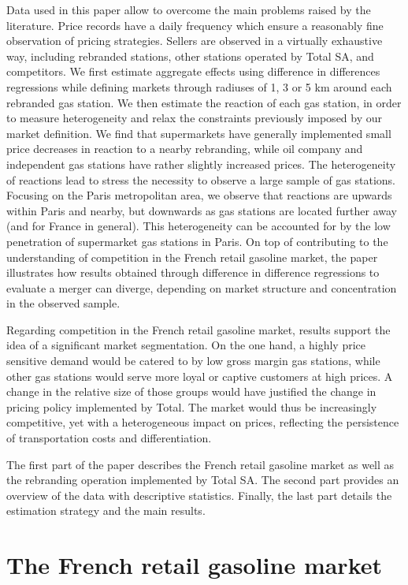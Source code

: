 \documentclass[english]{article}
\begin{document}
Data used in this paper allow to overcome the main problems raised by the literature. Price records have a daily frequency which ensure a reasonably fine observation of pricing strategies. Sellers are observed in a virtually exhaustive way, including rebranded stations, other stations operated by Total SA, and competitors. We first estimate aggregate effects using difference in differences regressions while defining markets through radiuses of 1, 3 or 5 km around each rebranded gas station. We then estimate the reaction of each gas station, in order to measure heterogeneity and relax the constraints previously imposed by our market definition. We find that supermarkets have generally implemented small price decreases in reaction to a nearby rebranding, while oil company and independent gas stations have rather slightly increased prices. The heterogeneity of reactions lead to stress the necessity to observe a large sample of gas stations. Focusing on the Paris metropolitan area, we observe that reactions are upwards within Paris and nearby, but downwards as gas stations are located further away (and for France in general). This heterogeneity can be accounted for by the low penetration of supermarket gas stations in Paris. On top of contributing to the understanding of competition in the French retail gasoline market, the paper illustrates how results obtained through difference in difference regressions to evaluate a merger can diverge, depending on market structure and concentration in the observed sample.
\medskip{}

Regarding competition in the French retail gasoline market, results support the idea of a significant market segmentation. On the one hand, a highly price sensitive demand would be catered to by low gross margin gas stations, while other gas stations would serve more loyal or captive customers at high prices. A change in the relative size of those groups would have justified the change in pricing policy implemented by Total. The market would thus be increasingly competitive, yet with a heterogeneous impact on prices, reflecting the persistence of transportation costs and differentiation.
\medskip{}

The first part of the paper describes the French retail gasoline market as well as the rebranding operation implemented by Total SA. The second part provides an overview of the data with descriptive statistics. Finally, the last part details the estimation strategy and the main results.

\section{The French retail gasoline market}
\end{document}
